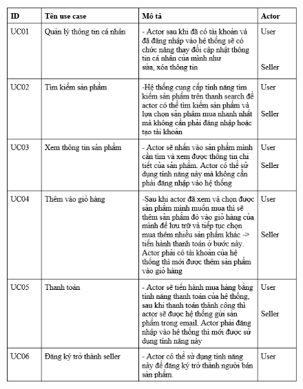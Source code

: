 \documentclass{article}
\begin{document}
\begin{center}
	\begin{figure}[htp]
		\begin{center}
			\includegraphics[scale=.930]{anh5.png}
		
		\end{center}
	
		
	\end{figure}
\end{center}
\newpage
\end{document}
